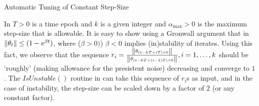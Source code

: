 \begin{algorithm}[H]
\caption{Automatic Tuning of Constant Step-Size}
\begin{algorithmic}[1]
\ENDIF
\ENDFOR
\end{algorithmic}
\label{alg:tuning}
\end{algorithm}
In  $T>0$ is a time epoch and $k$ is a given integer and $\alpha_{\max}>0$ is the maximum step-size that is allowable. It is easy to show using a Gronwall argument that in  $\left\| \theta_t\right\|\leq (1-e^{\beta t})$, where ($\beta>0)$) $\beta<0$ implies (in)stability of iterates. Using this fact, we observe that the sequence $r_i=\frac{\left\| \theta_{(t-kT+iT)\wedge 0}\right\|}{\left\| \theta_{(t-kT+(i-1)T)\wedge 0}\right\|},i=1,\ldots,k$ should be `roughly' (making allowance for the presistent noise) decreasing and converge to $1$. The $IsUnstable()$ routine in  can take this sequence of $r_i$s as input, and in the case of instability, the step-size can be scaled down by a factor of $2$ (or any constant factor).
\begin{comment}
In \Cref{alg:tuning} IsUnstable$(\rho_j,j=1,\ldots,i\}$) is a routine whose input is $\norm{\theta_t}$ measured at time instances $k$ apart.
It is easy to show from Gronwall type arguments that the $\norm{\theta_t}\leq (1-exp{\beta t})$, where $\beta>0$ implies stability and $\beta<0$ imples instability. From this Gronwall based inequality, we observe that when the iterates are stable the ratio $\frac{\rho_{k+1}}{\rho_k},k=1,\ldots,i-1$ should be `roughly' decreasing (because there is the iterates are persistently corrupted by noise) and should converge to $1$. This condition on the sequence $\frac{\rho_{k+1}}{\rho_k}$ can be checked in practice with appropriate tolerances.
\end{comment}
